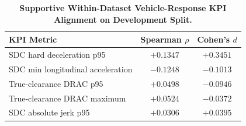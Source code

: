 \begin{table}[h]
\centering
\footnotesize
\setlength{\tabcolsep}{4.5pt}
\renewcommand{\arraystretch}{0.88}
\vspace{-3mm}
\caption{\textbf{Supportive Within-Dataset Vehicle-Response KPI Alignment on Development Split.}}
\label{tab:supp_kpi}
\begin{tabular}{lcc}
\toprule
\textbf{KPI Metric} & \textbf{Spearman $\rho$} & \textbf{Cohen's $d$} \\
\midrule
SDC hard deceleration p95 & $+0.1347$ & $+0.3451$ \\
SDC min longitudinal acceleration & $-0.1248$ & $-0.1013$ \\
True-clearance DRAC p95 & $+0.0498$ & $-0.0946$ \\
True-clearance DRAC maximum & $+0.0524$ & $-0.0372$ \\
SDC absolute jerk p95 & $+0.0306$ & $+0.0395$ \\
\bottomrule
\end{tabular}
\end{table}
